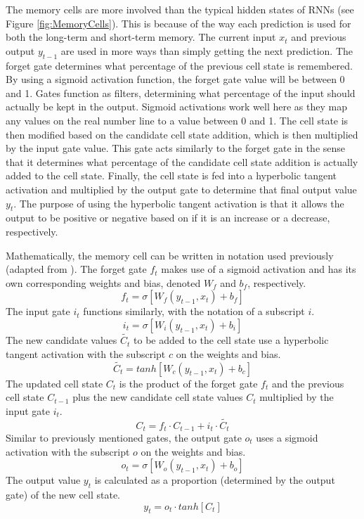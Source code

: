 The memory cells are more involved than the typical hidden states of RNNs (see Figure \ref{fig:MemoryCells}). This is because of the way each prediction is used for both the long-term and short-term memory. The current input $x_t$ and previous output $y_{t-1}$ are used in more ways than simply getting the next prediction. The forget gate determines what percentage of the previous cell state is remembered. By using a sigmoid activation function, the forget gate value will be between 0 and 1. Gates function as filters, determining what percentage of the input should actually be kept in the output. Sigmoid activations work well here as they map any values on the real number line to a value between 0 and 1. The cell state is then modified based on the candidate cell state addition, which is then multiplied by the input gate value. This gate acts similarly to the forget gate in the sense that it determines what percentage of the candidate cell state addition is actually added to the cell state. Finally, the cell state is fed into a hyperbolic tangent activation and multiplied by the output gate to determine that final output value $y_t$. The purpose of using the hyperbolic tangent activation is that it allows the output to be positive or negative based on if it is an increase or a decrease, respectively.

Mathematically, the memory cell can be written in notation used previously (adapted from \cite{understandinglstm}). The forget gate $f_t$ makes use of a sigmoid activation and has its own corresponding weights and bias, denoted $W_f$ and $b_f$, respectively.
\begin{equation*}
    f_t = \sigma[W_f(y_{t-1}, x_t) + b_f] 
\end{equation*}
The input gate $i_t$ functions similarly, with the notation of a subscript $i$.
\begin{equation*}
    i_t = \sigma[W_i(y_{t-1}, x_t) + b_i] 
\end{equation*}
The new candidate values $\tilde{C_t}$ to be added to the cell state use a hyperbolic tangent activation with the subscript $c$ on the weights and bias.
\begin{equation*}
    \tilde{C_t} = tanh[W_c(y_{t-1}, x_t) + b_c]
\end{equation*}
The updated cell state $C_t$ is the product of the forget gate $f_t$ and the previous cell state $C_{t-1}$ plus the new candidate cell state values $C_{t}$ multiplied by the input gate $i_t$.
\begin{equation*}
    C_t = f_t\cdot C_{t-1} + i_t\cdot \tilde{C_t}
\end{equation*}
Similar to previously mentioned gates, the output gate $o_t$ uses a sigmoid activation with the subscript $o$ on the weights and bias.
\begin{equation*}
    o_t = \sigma[W_o(y_{t-1}, x_t) + b_o]
\end{equation*}
The output value $y_t$ is calculated as a proportion (determined by the output gate) of the new cell state.
\begin{equation*}
    y_t = o_t\cdot tanh[C_t]
\end{equation*}
